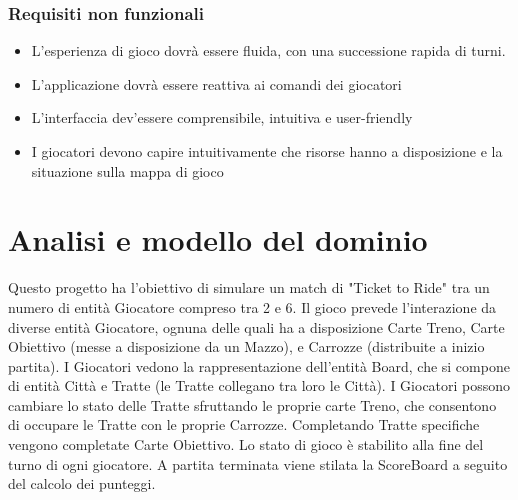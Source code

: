 \documentclass[a4paper,12pt]{report}
\begin{document}
\subsubsection{Requisiti non funzionali}
\begin{itemize}
	\item L'esperienza di gioco dovrà essere fluida, con una successione rapida di turni.
 \item L'applicazione dovrà essere reattiva ai comandi dei giocatori
 \item L'interfaccia dev'essere comprensibile, intuitiva e user-friendly
 \item I giocatori devono capire intuitivamente che risorse hanno a disposizione e la situazione sulla mappa di gioco
\end{itemize}

\section{Analisi e modello del dominio}

Questo progetto ha l'obiettivo di simulare un match di "Ticket to Ride" tra un numero di entità Giocatore compreso tra 2 e 6. Il gioco prevede l'interazione da diverse entità Giocatore, ognuna delle quali ha a disposizione Carte Treno, Carte Obiettivo (messe a disposizione da un Mazzo), e Carrozze (distribuite a inizio partita). I Giocatori vedono la rappresentazione dell'entità Board, che si compone di entità Città e Tratte (le Tratte collegano tra loro le Città). I Giocatori possono cambiare lo stato delle Tratte sfruttando le proprie carte Treno, che consentono di occupare le Tratte con le proprie Carrozze. Completando Tratte specifiche vengono completate Carte Obiettivo. Lo stato di gioco è stabilito alla fine del turno di ogni giocatore. A partita terminata viene stilata la ScoreBoard a seguito del calcolo dei punteggi.
\end{document}
